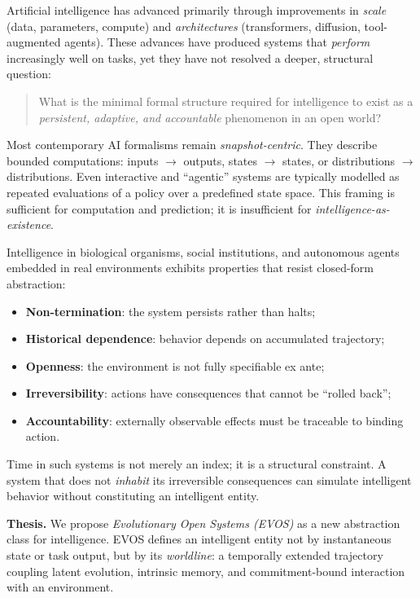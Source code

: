 \documentclass[11pt]{article}
\begin{document}
Artificial intelligence has advanced primarily through improvements in
\emph{scale} (data, parameters, compute) and \emph{architectures} (transformers,
diffusion, tool-augmented agents). These advances have produced systems that
\emph{perform} increasingly well on tasks, yet they have not resolved a deeper,
structural question:

\begin{quote}
What is the minimal formal structure required for intelligence to exist
as a \emph{persistent, adaptive, and accountable} phenomenon in an open world?
\end{quote}

Most contemporary AI formalisms remain \emph{snapshot-centric}. They describe
bounded computations: inputs $\to$ outputs, states $\to$ states, or distributions
$\to$ distributions. Even interactive and ``agentic'' systems are typically
modelled as repeated evaluations of a policy over a predefined state space.
This framing is sufficient for computation and prediction; it is insufficient
for \emph{intelligence-as-existence}.

Intelligence in biological organisms, social institutions, and autonomous agents
embedded in real environments exhibits properties that resist closed-form
abstraction:
\begin{itemize}
  \item \textbf{Non-termination}: the system persists rather than halts;
  \item \textbf{Historical dependence}: behavior depends on accumulated trajectory;
  \item \textbf{Openness}: the environment is not fully specifiable ex ante;
  \item \textbf{Irreversibility}: actions have consequences that cannot be ``rolled back'';
  \item \textbf{Accountability}: externally observable effects must be traceable to binding action.
\end{itemize}

Time in such systems is not merely an index; it is a structural constraint.
A system that does not \emph{inhabit} its irreversible consequences can simulate
intelligent behavior without constituting an intelligent entity.

\vspace{0.75em}
\noindent\textbf{Thesis.}
We propose \emph{Evolutionary Open Systems (EVOS)} as a new abstraction class
for intelligence. EVOS defines an intelligent entity not by instantaneous state
or task output, but by its \emph{worldline}: a temporally extended trajectory
coupling latent evolution, intrinsic memory, and commitment-bound interaction
with an environment.
\end{document}
